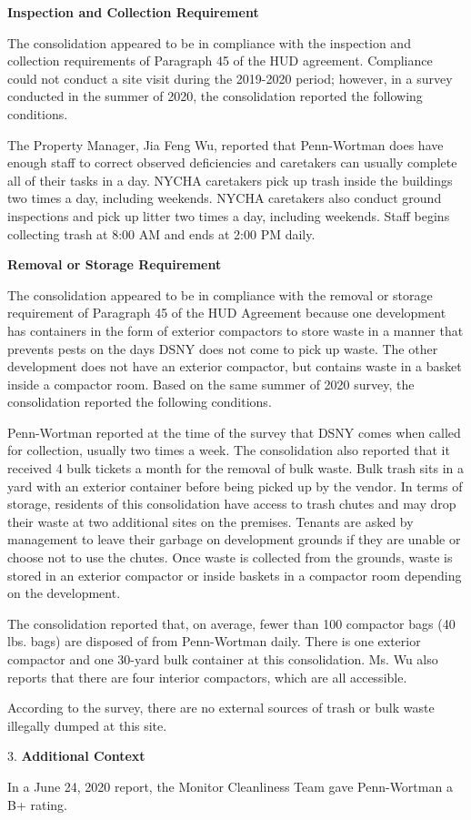 

\textbf{Inspection and Collection Requirement}

The consolidation appeared to be in compliance with the inspection and collection requirements of Paragraph 45 of the HUD agreement. Compliance could not conduct a site visit during the 2019-2020 period; however, in a survey conducted in the summer of 2020, the consolidation reported the following conditions.

The Property Manager, Jia Feng Wu, reported that Penn-Wortman does have enough staff to correct observed deficiencies and caretakers can usually complete all of their tasks in a day. NYCHA caretakers pick up trash inside the buildings two times a day, including weekends. NYCHA caretakers also conduct ground inspections and pick up litter two times a day, including weekends. Staff begins collecting trash at 8:00 AM and ends at 2:00 PM daily. 

\textbf{Removal or Storage Requirement}

The consolidation appeared to be in compliance with the  removal or storage requirement of Paragraph  45 of the HUD Agreement because one development has containers in the form of exterior compactors to store waste in a manner that prevents pests on the days DSNY does not come to pick up waste. The other development does not have an exterior compactor, but contains waste in a basket inside a compactor room. Based on the same summer of  2020 survey, the consolidation reported the following conditions.

Penn-Wortman reported at the time of the survey that DSNY comes when called for collection, usually two times a week. The consolidation also reported that it received 4 bulk tickets a month for the removal of bulk waste. Bulk trash sits in a yard with an exterior container before being picked up by the vendor. In terms of storage, residents of this consolidation have access to trash chutes and may drop their waste at two additional sites on the premises. Tenants are asked by management to leave their garbage on development grounds if they are unable or choose not to use the chutes. Once waste is collected from the grounds, waste is stored in an exterior compactor or inside baskets in a compactor room depending on the development. 

The consolidation reported that, on average, fewer than 100 compactor bags (40 lbs. bags) are disposed of from Penn-Wortman daily. There is one exterior compactor and one 30-yard bulk container at this consolidation. Ms. Wu also reports that there are four interior compactors, which are all accessible.

According to the survey, there are no external sources of trash or bulk waste illegally dumped at this site. 

3. \textbf{Additional Context} 

In a June 24, 2020 report, the Monitor Cleanliness Team gave Penn-Wortman a B+ rating. 